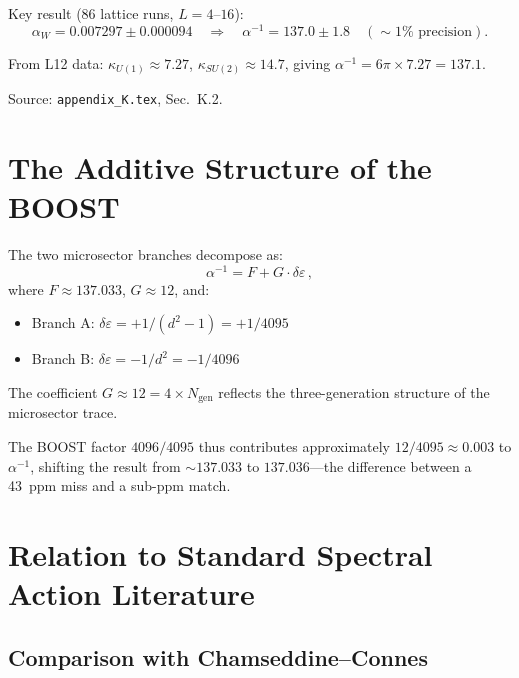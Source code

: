 \documentclass[12pt,a4paper]{article}
\begin{document}
Key result (86 lattice runs, $L = 4$--$16$):
\begin{equation}
\alpha_W = 0.007297 \pm 0.000094
\quad\Longrightarrow\quad
\alpha^{-1} = 137.0 \pm 1.8
\quad(\sim 1\%\text{ precision}).
\end{equation}

From L12 data: $\kappa_{U(1)} \approx 7.27$,
$\kappa_{SU(2)} \approx 14.7$, giving
$\alpha^{-1} = 6\pi \times 7.27 = 137.1$.

Source: \texttt{appendix\_K.tex}, Sec.~K.2.

\section{The Additive Structure of the BOOST}
\label{sec:additive}

The two microsector branches decompose as:
\begin{equation}
\alpha^{-1} = F + G \cdot \delta\varepsilon\,,
\end{equation}
where $F \approx 137.033$, $G \approx 12$, and:
\begin{itemize}
\item Branch A: $\delta\varepsilon = +1/(d^2 - 1) = +1/4095$
\item Branch B: $\delta\varepsilon = -1/d^2 = -1/4096$
\end{itemize}

The coefficient $G \approx 12 = 4 \times N_{\mathrm{gen}}$ reflects
the three-generation structure of the microsector trace.

The BOOST factor $4096/4095$ thus contributes approximately
$12/4095 \approx 0.003$ to $\alpha^{-1}$, shifting the result from
$\sim 137.033$ to $137.036$---the difference between a 43~ppm miss
and a sub-ppm match.

\section{Relation to Standard Spectral Action Literature}
\label{sec:comparison}

\subsection{Comparison with Chamseddine--Connes}
\end{document}
